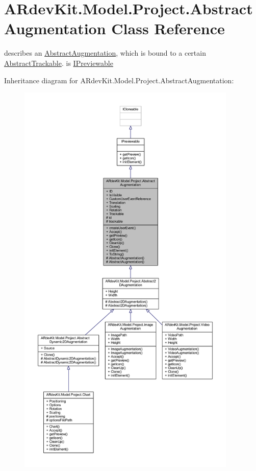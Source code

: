 \hypertarget{class_a_rdev_kit_1_1_model_1_1_project_1_1_abstract_augmentation}{\section{A\-Rdev\-Kit.\-Model.\-Project.\-Abstract\-Augmentation Class Reference}
\label{class_a_rdev_kit_1_1_model_1_1_project_1_1_abstract_augmentation}
}


describes an \hyperlink{class_a_rdev_kit_1_1_model_1_1_project_1_1_abstract_augmentation}{Abstract\-Augmentation}, which is bound to a certain \hyperlink{class_a_rdev_kit_1_1_model_1_1_project_1_1_abstract_trackable}{Abstract\-Trackable}. is \hyperlink{interface_a_rdev_kit_1_1_model_1_1_project_1_1_i_previewable}{I\-Previewable}  




Inheritance diagram for A\-Rdev\-Kit.\-Model.\-Project.\-Abstract\-Augmentation\-:
\nopagebreak
\begin{figure}[H]
\begin{center}
\leavevmode
\includegraphics[height=550pt]{class_a_rdev_kit_1_1_model_1_1_project_1_1_abstract_augmentation__inherit__graph}
\end{center}
\end{figure}


